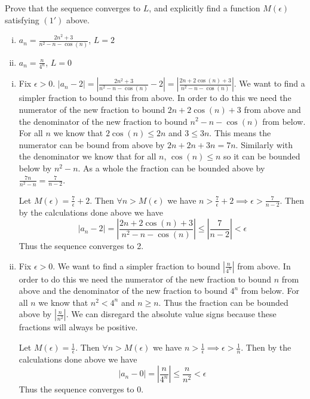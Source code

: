 \documentclass[paper=a4, fontsize=11pt]{jhwhw} %
\begin{document}
Prove that the sequence converges to $L$, and explicitly find a function $M(\epsilon)$ satisfying $(1')$ above.
\begin{enumerate}[(i)]
    \item $a_n = \frac{2n^2 + 3}{n^2 - n - \cos(n)}$, $L = 2$
    \item $a_n = \frac{n}{4^n}$, $L = 0$
\end{enumerate}
\solution
\begin{enumerate}[(i)]
    \item Fix $\epsilon > 0$. $|a_n - 2| = \left|\frac{2n^2 + 3}{n^2 - n - \cos(n)} - 2\right| = \left|\frac{2n + 2\cos(n) + 3}{n^2-n-\cos(n)}\right|$. We want to find a simpler fraction to bound this from above. In order to do this we need the numerator of the new fraction to bound $2n + 2\cos(n) + 3$ from above and the denominator of the new fraction to bound $n^2 - n - \cos(n)$ from below. For all $n$ we know that $2\cos(n) \le 2n$ and $3 \le 3n$. This means the numerator can be bound from above by $2n + 2n + 3n = 7n$. Similarly with the denominator we know that for all $n$, $\cos(n) \le n$ so it can be bounded below by $n^2 - n$. As a whole the fraction can be bounded above  by $\frac{7n}{n^2-n} = \frac{7}{n-2}$. 

        Let $M(\epsilon) = \frac{7}{\epsilon} + 2$. Then $\forall n > M(\epsilon)$ we have $n > \frac{7}{\epsilon} + 2 \implies \epsilon > \frac{7}{n-2}$. Then by the calculations done above we have
        $$|a_n - 2| = \left|\frac{2n + 2\cos(n) + 3}{n^2 - n - \cos(n)}\right| \le \left|\frac{7}{n-2}\right| < \epsilon$$
        Thus the sequence converges to 2.

    \item Fix $\epsilon > 0$. We want to find a simpler fraction to bound $\left|\frac{n}{4^n}\right|$ from above. In order to do this we need the numerator of the new fraction to bound $n$ from above and the denominator of the new fraction to bound $4^n$ from below. For all $n$ we know that $n^2 < 4^n$ and $n \ge n$. Thus the fraction can be bounded above by $\left|\frac{n}{n^2}\right|$. We can disregard the absolute value signs because these fractions will always be positive.

        Let $M(\epsilon) = \frac{1}{\epsilon}$. Then $\forall n > M(\epsilon)$ we have $n > \frac{1}{\epsilon} \implies \epsilon > \frac{1}{n}$. Then by the calculations done above we have
        $$|a_n - 0| = \left|\frac{n}{4^n}\right| \le \frac{n}{n^2} < \epsilon$$
        Thus the sequence converges to 0.
\end{enumerate}
\end{document}
